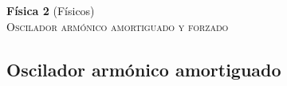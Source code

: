 \documentclass[11pt,spanish,a4paper]{article}
\begin{document}
\begin{center}
\textbf{Física 2} (Físicos) \hfill {}\\
\textsc{\LARGE Oscilador armónico amortiguado y forzado}\\
\end{center}


\begin{enumerate}


\subsection*{Oscilador armónico amortiguado}


\end{enumerate}
\end{document}

